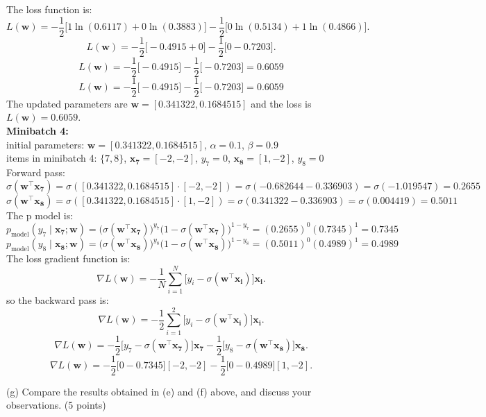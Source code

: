 \documentclass[a3paper,12pt]{article} %
\begin{document}
The loss function is:
\[
L(\mathbf{w}) = -\frac{1}{2} \big[1 \ln(0.6117) + 0 \ln(0.3883)\big] - \frac{1}{2} \big[0 \ln(0.5134) + 1 \ln(0.4866)\big].
\]
\[
L(\mathbf{w}) = -\frac{1}{2} \big[-0.4915 + 0\big] - \frac{1}{2} \big[0 -0.7203\big].
\]
\[
L(\mathbf{w}) = -\frac{1}{2} \big[-0.4915\big] - \frac{1}{2} \big[-0.7203\big] = 0.6059
\]
\[
L(\mathbf{w}) = -\frac{1}{2} \big[-0.4915\big] - \frac{1}{2} \big[-0.7203\big] = 0.6059
\]
The updated parameters are \(\mathbf{w} = \mathbf{[0.341322, 0.1684515]}\) and the loss is \(L(\mathbf{w}) = \mathbf{0.6059}\).
\\ \textbf{Minibatch 4:}
\\ initial parameters: \(\mathbf{w} = [0.341322, 0.1684515]\), \(\alpha = 0.1\), \(\beta = 0.9\)
\\ items in minibatch 4: \(\{7, 8\}\), \(\mathbf{x_7} = [-2, -2]\), \(y_7 = 0\), \(\mathbf{x_8} = [1, -2]\), \(y_8 = 0\)
\\ Forward pass:
\[
\sigma(\mathbf{w}^\top \mathbf{x_7}) = \sigma([0.341322, 0.1684515] \cdot [-2, -2]) = \sigma(-0.682644 - 0.336903) = \sigma(-1.019547) = 0.2655
\]
\[
\sigma(\mathbf{w}^\top \mathbf{x_8}) = \sigma([0.341322, 0.1684515] \cdot [1, -2]) = \sigma(0.341322 - 0.336903) = \sigma(0.004419) = 0.5011
\]
The p model is:
\[
p_{\text{model}}(y_7 \mid \mathbf{x_7}; \mathbf{w}) = \big(\sigma(\mathbf{w}^\top \mathbf{x_7})\big)^{y_7} \big(1 - \sigma(\mathbf{w}^\top \mathbf{x_7})\big)^{1-y_7} = (0.2655)^0 (0.7345)^1 = 0.7345
\]
\[
p_{\text{model}}(y_8 \mid \mathbf{x_8}; \mathbf{w}) = \big(\sigma(\mathbf{w}^\top \mathbf{x_8})\big)^{y_8} \big(1 - \sigma(\mathbf{w}^\top \mathbf{x_8})\big)^{1-y_8} = (0.5011)^0 (0.4989)^1 = 0.4989
\]
The loss gradient function is:
\[
\nabla L(\mathbf{w}) = -\frac{1}{N} \sum^N_{i=1} \big[y_i - \sigma(\mathbf{w}^\top \mathbf{x_i})\big] \mathbf{x_i}.
\]
so the backward pass is:
\[
\nabla L(\mathbf{w}) = -\frac{1}{2} \sum^2_{i=1} \big[y_i - \sigma(\mathbf{w}^\top \mathbf{x_i})\big] \mathbf{x_i}.
\]
\[
\nabla L(\mathbf{w}) = -\frac{1}{2} \big[y_7 - \sigma(\mathbf{w}^\top \mathbf{x_7})\big] \mathbf{x_7} - \frac{1}{2} \big[y_8 - \sigma(\mathbf{w}^\top \mathbf{x_8})\big] \mathbf{x_8}.
\]
\[
\nabla L(\mathbf{w}) = -\frac{1}{2} \big[0 - 0.7345\big] [-2, -2] - \frac{1}{2} \big[0 - 0.4989\big] [1, -2].
\]

(g)
Compare the results obtained in (e) and (f) above, and discuss your observations.
\hfill (5 points)
\end{document}
